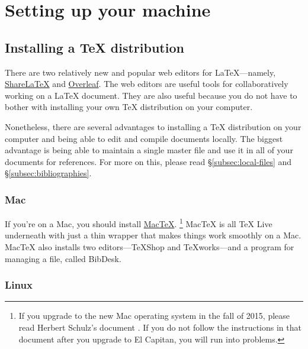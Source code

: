 
\section{Setting up your machine}
\label{sec:setting-up-your-machine}

\subsection{Installing a \TeX{} distribution}
\label{subsec:installing-a-tex-distro}

There are two relatively new and popular web editors for \LaTeX---namely, \href{https://www.sharelatex.com/}{ShareLaTeX} and \href{https://www.overleaf.com/}{Overleaf}.
The web editors are useful tools for collaboratively working on a \LaTeX{} document.
They are also useful because you do not have to bother with installing your own \TeX{} distribution on your computer.

Nonetheless, there are several advantages to installing a \TeX{} distribution on your computer and being able to edit and compile  documents locally.
The biggest advantage is being able to maintain a single master  file and use it in all of your  documents for references.
For more on this, please read \S\ref{subsec:local-files} and \S\ref{subsec:bibliographies}.

\subsubsection{Mac}
\label{subsubsec:tex-distro:mac}

If you're on a Mac, you should install \href{https://tug.org/mactex/}{{Mac\TeX}}.%
\footnote{%
If you upgrade to the new Mac operating system in the fall of 2015, please read Herbert Schulz's document \href{https://tug.org/mactex/UpdatingForElCapitan.pdf}{}.
If you do not follow the instructions in that document after you upgrade to El Capitan, you will run into problems.%
}
{Mac\TeX} is all TeX Live underneath with just a thin wrapper that makes things work smoothly on a Mac.
{Mac\TeX} also installs two editors---TeXShop and TeXworks---and a program for managing a  file, called BibDesk.

\subsubsection{Linux}
\label{subsubsec:tex-distro:linux}


